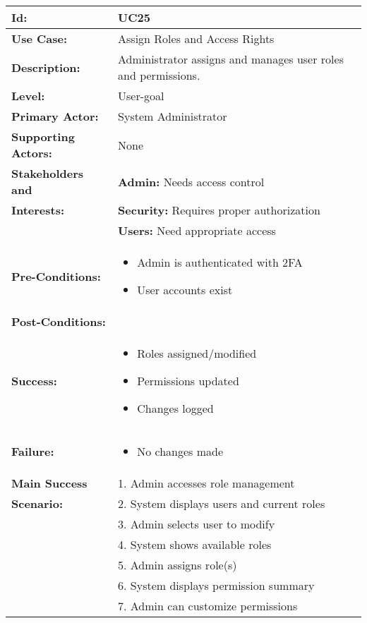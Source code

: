 \documentclass[12pt]{article}
\begin{document}
\begin{longtable}{|p{3cm}|p{11cm}|}
\hline
\textbf{Id:} & UC25 \\
\hline
\textbf{Use Case:} & Assign Roles and Access Rights \\
\hline
\textbf{Description:} & Administrator assigns and manages user roles and permissions. \\
\hline
\textbf{Level:} & User-goal \\
\hline
\textbf{Primary Actor:} & System Administrator \\
\hline
\textbf{Supporting Actors:} & None \\
\hline
\textbf{Stakeholders and} & \textbf{Admin:} Needs access control \\
\textbf{Interests:} & \textbf{Security:} Requires proper authorization \\
& \textbf{Users:} Need appropriate access \\
\hline
\textbf{Pre-Conditions:} & 
\begin{itemize}
    \item Admin is authenticated with 2FA
    \item User accounts exist
\end{itemize} \\
\hline
\textbf{Post-Conditions:} & \\
\textbf{Success:} & 
\begin{itemize}
    \item Roles assigned/modified
    \item Permissions updated
    \item Changes logged
\end{itemize} \\
\textbf{Failure:} & 
\begin{itemize}
    \item No changes made
\end{itemize} \\
\hline
\textbf{Main Success} & 1. Admin accesses role management \\
\textbf{Scenario:} & 2. System displays users and current roles \\
& 3. Admin selects user to modify \\
& 4. System shows available roles \\
& 5. Admin assigns role(s) \\
& 6. System displays permission summary \\
& 7. Admin can customize permissions \\

\end{longtable}
\end{document}
